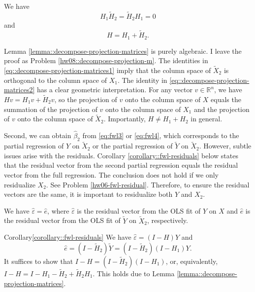 \begin{lemma}
\label{lemma::decompose-projection-matrices}
We have
\begin{equation}\label{eq::decompose-projection-matrices1}
H_1 \tilde{H}_2  = \tilde{H}_2  H_1 = 0
\end{equation}
and
\begin{equation}\label{eq::decompose-projection-matrices2}
H = H_1 +  \tilde{H}_2. 
\end{equation}
\end{lemma}

Lemma \ref{lemma::decompose-projection-matrices} is purely algebraic. I leave the proof as Problem \ref{hw08::decompose-projection-m}. 
The  identities in \eqref{eq::decompose-projection-matrices1} imply that the column space of $\tilde{X}_{2}$ is orthogonal to the column space of $X_1$.  
The identity in \eqref{eq::decompose-projection-matrices2} has a clear geometric interpretation. For any vector $v \in \mathbb{R}^n$, we have $Hv = H_1v +  \tilde{H}_2v$, so the projection of $v$ onto the column space of $X$ equals the summation of the projection of $v$ onto the column space of $X_1$ and the projection of $v$ onto the column space of $\tilde{X}_{2}$. Importantly, $H \neq H_1 + H_2$ in general. 



Second, we can obtain $\hat{\beta}_2$ from \eqref{eq:fwl3} or \eqref{eq:fwl4}, which corresponds to the partial regression of $Y$ on $\tilde{X}_{2}$ or the partial regression of $\tilde{Y}$ on $\tilde{X}_{2}$. However, subtle issues arise with the residuals. 
Corollary \ref{corollary::fwl-residuals} below states that the residual vector from the second partial regression equals the residual vector from the full regression. The conclusion does not hold if we only residualize $X_2$. See Problem \ref{hw06-fwl-residual}. Therefore, to ensure the residual vectors are the same, it is important to residualize both $Y$ and $X_2$. 

\begin{corollary}
\label{corollary::fwl-residuals}
We have $\hat{\varepsilon} = \hat{e}$, where $\hat{\varepsilon}$ is the residual vector from the OLS fit of $Y$ on $X$ and $\hat{e}$ is the residual vector from the OLS fit of $\tilde{Y}$ on $\tilde{X}_{2}$, respectively. 
\end{corollary} 

 

\begin{myproof}{Corollary}{\ref{corollary::fwl-residuals}}
We have $\hat{ \varepsilon} = (I-H)Y$ and 
$$
\hat{e}= (I-\tilde{H}_2) \tilde{Y} = (I- \tilde{H}_2)(I-H_1) Y .
$$ 
It suffices to show that $I-H = (I- \tilde{H}_2)(I-H_1)$, or, equivalently, $ I-H =  I - H_1 - \tilde{H}_2 + \tilde{H}_2 H_1$. This holds due to Lemma \ref{lemma::decompose-projection-matrices}. 
\end{myproof}

